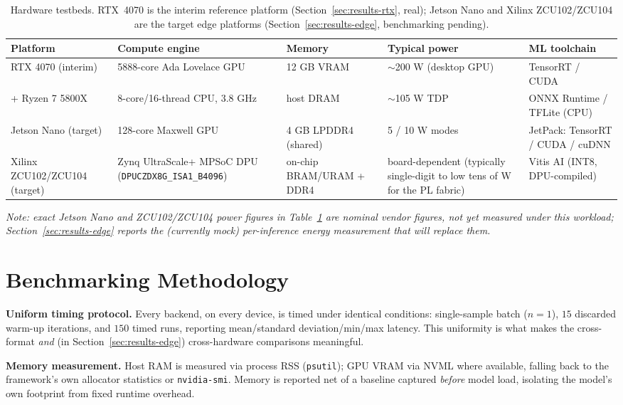 \documentclass[11pt,a4paper]{article}
\begin{document}
\begin{table}[ht]
\centering
\caption{Hardware testbeds. RTX~4070 is the interim reference platform (Section~\ref{sec:results-rtx}, real); Jetson Nano and Xilinx ZCU102/ZCU104 are the target edge platforms (Section~\ref{sec:results-edge}, benchmarking pending).}
\label{tab:hardware}
\begin{tabular}{@{}lllll@{}}
\toprule
Platform & Compute engine & Memory & Typical power & ML toolchain \\
\midrule
RTX 4070 (interim) & 5888-core Ada Lovelace GPU~\cite{nvidia2022adalovelace} & 12 GB VRAM & $\sim$200 W (desktop GPU) & TensorRT / CUDA \\
+ Ryzen 7 5800X & 8-core/16-thread CPU, 3.8 GHz & host DRAM & $\sim$105 W TDP & ONNX Runtime / TFLite (CPU) \\
Jetson Nano (target) & 128-core Maxwell GPU~\cite{nvidia2019jetsonnano} & 4 GB LPDDR4 (shared) & 5 / 10 W modes & JetPack: TensorRT / CUDA / cuDNN \\
Xilinx ZCU102/ZCU104 (target) & Zynq UltraScale+ MPSoC DPU (\texttt{DPUCZDX8G\_ISA1\_B4096})~\cite{xilinx2023zcu102,xilinx2023vitisai} & on-chip BRAM/URAM + DDR4 & board-dependent (typically single-digit to low tens of W for the PL fabric) & Vitis AI (INT8, DPU-compiled) \\
\bottomrule
\end{tabular}
\end{table}

\noindent\textit{Note: exact Jetson Nano and ZCU102/ZCU104 power figures in
Table~\ref{tab:hardware} are nominal vendor figures, not yet measured under this
workload; Section~\ref{sec:results-edge} reports the (currently mock) per-inference energy
measurement that will replace them.}

\section{Benchmarking Methodology}
\label{sec:methodology}

\textbf{Uniform timing protocol.} Every backend, on every device, is timed under
identical conditions: single-sample batch ($n=1$), $15$ discarded warm-up iterations,
and $150$ timed runs, reporting mean/standard deviation/min/max latency. This uniformity
is what makes the cross-format \emph{and} (in Section~\ref{sec:results-edge})
cross-hardware comparisons meaningful.

\textbf{Memory measurement.} Host RAM is measured via process RSS (\texttt{psutil});
GPU VRAM via NVML where available, falling back to the framework's own allocator
statistics or \texttt{nvidia-smi}. Memory is reported net of a baseline captured
\emph{before} model load, isolating the model's own footprint from fixed runtime
overhead.
\end{document}
